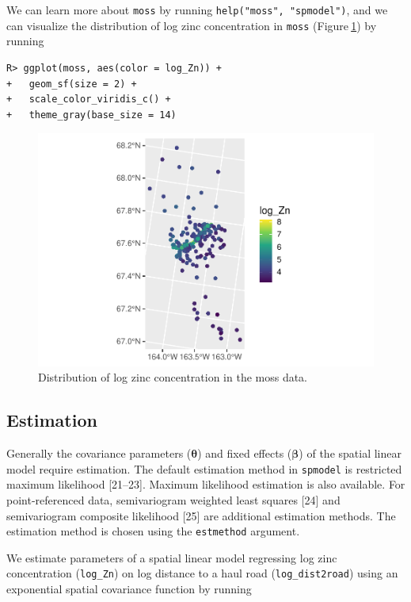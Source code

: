 \documentclass[10pt,letterpaper]{article}
\begin{document}
We can learn more about \texttt{moss} by running
\texttt{help("moss",\ "spmodel")}, and we can visualize the distribution
of log zinc concentration in \texttt{moss} (Figure\(~\)\ref{fig:log_zn})
by running

\begin{verbatim}
R> ggplot(moss, aes(color = log_Zn)) +
+   geom_sf(size = 2) +
+   scale_color_viridis_c() +
+   theme_gray(base_size = 14)
\end{verbatim}

\begin{figure}

{\centering \includegraphics[width=0.65\linewidth]{preprint_files/figure-latex/log_zn-1} 

}

\caption{Distribution of log zinc concentration in the moss data.}\label{fig:log_zn}
\end{figure}

\hypertarget{estimation}{%
\subsection{Estimation}\label{estimation}}

Generally the covariance parameters (\(\boldsymbol{\theta}\)) and fixed
effects (\(\boldsymbol{\beta}\)) of the spatial linear model require
estimation. The default estimation method in \texttt{spmodel} is
restricted maximum likelihood {[}21--23{]}. Maximum likelihood
estimation is also available. For point-referenced data, semivariogram
weighted least squares {[}24{]} and semivariogram composite likelihood
{[}25{]} are additional estimation methods. The estimation method is
chosen using the \texttt{estmethod} argument.

We estimate parameters of a spatial linear model regressing log zinc
concentration (\texttt{log\_Zn}) on log distance to a haul road
(\texttt{log\_dist2road}) using an exponential spatial covariance
function by running
\end{document}
